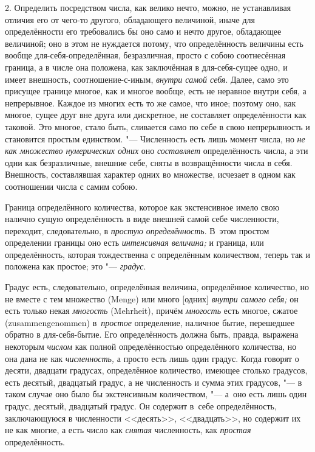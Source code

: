 2. Определить посредством числа, как велико нечто, можно, не устанавливая
отличия его от чего-то другого, обладающего величиной, иначе для определённости
его требовались бы оно само и нечто другое, обладающее величиной; оно в этом не
нуждается потому, что определённость величины есть вообще
для-себя-определённая, безразличная, просто с собою соотнесённая граница, а
в числе она положена, как заключённая в для-себя-сущее одно, и имеет внешность,
соотношение-с-иным, {\em внутри самой себя}. Далее, само это присущее границе
многое, как и многое вообще, есть не неравное внутри себя, а непрерывное.
Каждое из многих есть то же самое, что иное; поэтому оно, как многое, сущее
друг вне друга или дискретное, не составляет определённости как таковой. Это
многое, стало быть, сливается само по себе в свою непрерывность и становится
простым единством. "--- Численность есть лишь момент числа, но {\em не как
множество нумерических одних} оно {\em составляет} определённость числа, а эти
одни как безразличные, внешние себе, сняты в возвращённости числа в себя.
Внешность, составлявшая характер одних во множестве, исчезает в одном как
соотношении числа с самим собою.

Граница определённого количества, которое как экстенсивное имело свою налично
сущую определённость в виде внешней самой себе численности, переходит,
следовательно, в {\em простую определённость}. В~этом простом определении
границы оно есть {\em интенсивная величина;} и граница, или определённость,
которая тождественна с определённым количеством, теперь так и положена как
простое; это "--- {\em градус}.

Градус есть, следовательно, определённая величина, определённое количество, но
не вместе с тем множество (Menge) или много [одних] {\em внутри самого себя;}
он есть только некая {\em многость} (Mehrheit), причём {\em многость} есть
многое, сжатое (zusammen\-genommen) в~{\em простое} определение, наличное бытие,
перешедшее обратно в для-себя-бытие. Его определённость должна быть, правда,
выражена некоторым {\em числом} как полной определённостью определённого
количества, но она дана не как {\em численность,} а просто есть лишь один
градус. Когда говорят о десяти, двадцати градусах, определённое количество,
имеющее столько градусов, есть десятый, двадцатый градус, а не численность и
сумма этих градусов, "--- в таком случае оно было бы экстенсивным количеством,
"--- а~оно есть лишь один градус, десятый, двадцатый градус. Он содержит в~себе
определённость, заключающуюся в численности <<десять>>, <<двадцать>>, но
содержит их не как многие, а есть число как {\em снятая} численность, как
{\em простая} определённость.

